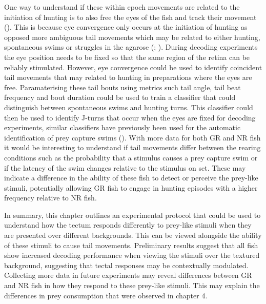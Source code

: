 One way to understand if these within epoch movements are related to the initiation of hunting is to also free the eyes of the fish and track their movement (\cite{Bianco2015}). This is because eye convergence only occurs at the initiation of hunting as opposed more ambiguous tail movements which may be related to either hunting, spontaneous swims or struggles in the agarose (\cite{Bianco2015}; \cite{Semmelhack2014}). During decoding experiments the eye position needs to be fixed so that the same region of the retina can be reliably stimulated. However, eye convergence could be used to identify coincident tail movements that may related to hunting in preparations where the eyes are free. Paramaterising these tail bouts using metrics such tail angle, tail beat frequency and bout duration could be used to train a classifier that could distinguish between spontaneous swims and hunting turns. This classifier could then be used to identify J-turns that occur when the eyes are fixed for decoding experiments, similar classifiers have previously been used for the automatic identification of prey capture swims (\cite{Semmelhack2014}). With more data for both GR and NR fish it would be interesting to understand if tail movements differ between the rearing conditions such as the probability that a stimulus causes a prey capture swim or if the latency of the swim changes relative to the stimulus on set. These may indicate a difference in the ability of these fish to detect or perceive the prey-like stimuli, potentially allowing GR fish to engage in hunting episodes with a higher frequency relative to NR fish. 

In summary, this chapter outlines an experimental protocol that could be used to understand how the tectum responds differently to prey-like stimuli when they are presented over different backgrounds. This can be viewed alongside the ability of these stimuli to cause tail movements. Preliminary results suggest that all fish show increased decoding performance when viewing the stimuli over the textured background, suggesting that tectal responses may be contextually modulated. Collecting more data in future experiments may reveal differences between GR and NR fish in how they respond to these prey-like stimuli. This may explain the differences in prey consumption that were observed in chapter 4.



